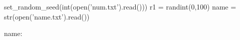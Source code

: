 \documentclass{article}
\begin{document}
\begin{sagesilent}
set_random_seed(int(open('num.txt').read()))
r1 = randint(0,100)
name = str(open('name.txt').read())
\end{sagesilent}

name: 

\end{document}
